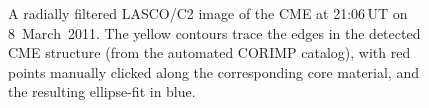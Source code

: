 \documentclass[namedreferences]{solarphysics}
\begin{document}
\begin{article}
\begin{figure}[t]
\caption{A radially filtered LASCO/C2 image of the CME at 21:06\,UT on 8~March~2011. The yellow contours trace the edges in the detected CME structure (from the automated CORIMP catalog), with red points manually clicked along the corresponding core material, and the resulting ellipse-fit in blue.}
\label{lasco_c2_fig}
\end{figure}



\end{article}
\end{document}
